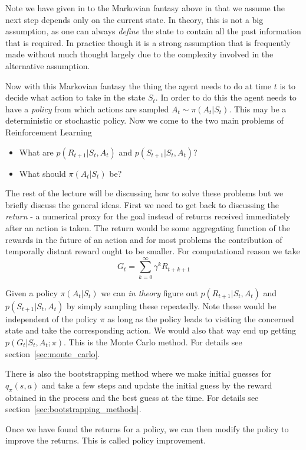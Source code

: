 \documentclass[11pt,a4paper]{article}
\newcommand\be{\begin{equation}}
\newcommand\ee{\end{equation}}
\begin{document}
Note we have given in to the Markovian fantasy above in that we assume the next step depends only on the current state. In theory, this is not a big assumption, as one can always {\em define} the state to contain all the past information that is required. In practice though it is a strong assumption that is frequently made without much thought largely due to the complexity involved in the alternative assumption.

Now with this Markovian fantasy the thing the agent needs to do at time $t$ is to decide what action to take in the state $S_t$. In order to do this the agent needs to have a {\em policy} from which actions are sampled $A_t \sim \pi(A_t|S_t)$. This may be a deterministic or stochastic policy. Now we come to the two main problems of Reinforcement Learning
\begin{itemize}
\item What are $p(R_{t+1} | S_t,A_t)$ and $p(S_{t+1}|S_t,A_t)$?
\item What should $\pi(A_t|S_t)$ be?
\end{itemize}

The rest of the lecture will be  discussing how to solve these problems but we briefly discuss the general ideas. First we need to get back to discussing the {\em return} - a numerical proxy for the goal instead of returns received immediately after an action is taken. The return would be some aggregating function of the rewards in the future of an action and for most problems the contribution  of temporally distant reward ought to be smaller. For computational reason we take
\be
G_t  = \sum_{k=0}^\infty \gamma^k R_{t+k+1}
\ee

Given a policy $\pi(A_t|S_t)$ we can {\em in theory} figure out $p(R_{t+1} | S_t,A_t)$ and $p(S_{t+1}|S_t,A_t)$ by simply sampling these repeatedly. Note these would be independent of the policy $\pi$ as long as the policy leads to visiting the concerned state and take the corresponding action. We would also that way end up getting $p(G_t|S_t,A_t;\pi)$. This is the Monte Carlo method. For details see section~\ref{sec:monte_carlo}.

There is also the bootstrapping method where we make initial guesses for $q_\pi(s,a)$ and take a few steps and update the initial guess by the reward obtained in the process and the best guess at the time. For details see section~\ref{sec:bootstrapping_methods}. 


Once we have found the returns for a policy, we can then modify the policy to improve the returns. This is called policy improvement. 
\end{document}
